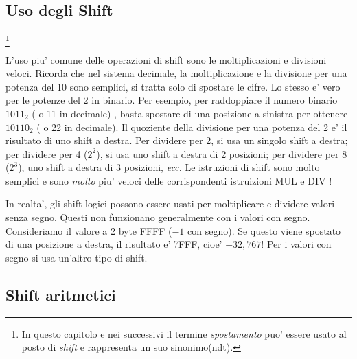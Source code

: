 \subsection{Uso degli Shift}\footnote{In questo capitolo e nei successivi
il termine \emph{spostamento} puo' essere usato al posto di \emph{shift} e
rappresenta un suo sinonimo(ndt).}

L'uso piu' comune delle operazioni di shift sono le moltiplicazioni e
divisioni veloci. Ricorda che nel sistema decimale, la moltiplicazione
e la divisione per una potenza del 10 sono semplici, si tratta solo
di spostare le cifre. Lo stesso e' vero per le potenze del 2 in binario.
Per esempio, per raddoppiare il numero binario $1011_2$ ( o 11 in decimale)
, basta spostare di una posizione a sinistra per ottenere $10110_2$
( o 22 in decimale). Il quoziente della divisione per una potenza del
2 e' il risultato di uno shift a destra. Per dividere per 2, si usa 
un singolo shift a destra; per dividere per 4 ($2^2$), si usa uno 
shift a destra di 2 posizioni; per dividere per 8 ($2^3$), uno shift
a destra di 3 posizioni, \emph{ecc.} Le istruzioni di shift sono
molto semplici e sono \emph{molto} piu' veloci delle corrispondenti
istruizioni {\code MUL}  e {\code DIV} !

In realta', gli shift logici possono essere usati per moltiplicare
e dividere valori senza segno. Questi non funzionano generalmente con
i valori con segno. Consideriamo il valore a 2 byte FFFF ($-1$ con 
segno). Se questo viene spostato di una posizione a destra, il risultato
e' 7FFF, cioe' $+32,767$! Per i valori con segno si usa un'altro tipo
di shift.

\subsection{Shift aritmetici}

